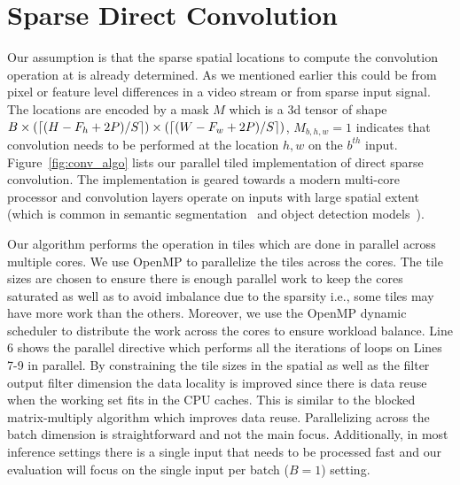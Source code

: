 \documentclass{article}
\begin{document}
\section{Sparse Direct Convolution}
Our assumption is that the sparse spatial locations to compute the convolution
operation at is already determined. As we mentioned earlier this could be from
pixel or feature level differences in a video stream or from sparse input
signal. The locations are encoded by a mask $M$ which is a 3d tensor of shape $B
\times (\lceil (H - F_h + 2P)/S \rceil) \times (\lceil (W - F_w + 2P)/S \rceil)$, $M_{b,h,w} =
1$ indicates that convolution needs to be performed at the location $h, w$ on
the $b^{th}$ input. Figure~\ref{fig:conv_algo} lists our parallel tiled
implementation of direct sparse convolution. The implementation is geared
towards a modern multi-core processor and convolution layers operate on inputs
with large spatial extent (which is common in semantic
segmentation~\cite{long2015fully} and object detection
models~\cite{he2017mask}). 

Our algorithm performs the operation in tiles which are done in parallel across
multiple cores. We use OpenMP to parallelize the tiles across the cores. The
tile sizes are chosen to ensure there is enough parallel work to keep the cores
saturated as well as to avoid imbalance due to the sparsity i.e., some tiles may
have more work than the others. Moreover, we use the OpenMP dynamic scheduler to
distribute the work across the cores to ensure workload balance. Line 6 shows
the parallel directive which performs all the iterations of loops on Lines 7-9
in parallel. By constraining the tile sizes in the spatial as well as the filter
output filter dimension the data locality is improved since there is data reuse
when the working set fits in the CPU caches.  This is similar to the blocked
matrix-multiply algorithm which improves data reuse.  Parallelizing across
the batch dimension is straightforward and not the main focus. Additionally, in
most inference settings there is a single input that needs to be processed fast
and our evaluation will focus on the single input per batch ($B=1$) setting.
\end{document}
